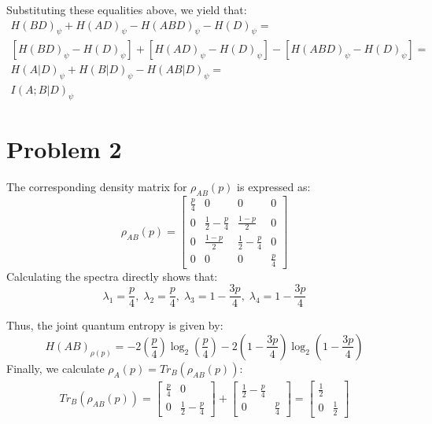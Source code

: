 \documentclass[12pt]{article}%
\begin{document}
\begin{enumerate}
Substituting these equalities above, we yield that:
\begin{gather*}
  H(BD)_{\psi} + H(AD)_{\psi} - H(ABD)_{\psi} - H(D)_{\psi} = \\
  [H(BD)_{\psi} - H(D)_{\psi}] + [H(AD)_{\psi} - H(D)_{\psi}] - [H(ABD)_{\psi} - H(D)_{\psi}] = \\
  H(A \vert D)_{\psi} + H(B \vert D)_{\psi} - H(AB \vert D)_{\psi} = \\
  \boxed{I(A;B\vert D)_{\psi}}
\end{gather*}

\section*{Problem 2}
The corresponding density matrix for $\rho_{AB}(p)$ is expressed as:
$$
\rho_{AB}(p) = \left[\begin{matrix}
  \frac{p}{4} & 0 & 0 & 0 \\
  0 & \frac{1}{2} - \frac{p}{4} & \frac{1-p}{2}  & 0 \\
  0 & \frac{1-p}{2} & \frac{1}{2} - \frac{p}{4} & 0\\
  0 & 0 & 0 & \frac{p}{4}
\end{matrix} \right]$$
Calculating the spectra directly shows that:
$$\lambda_1 = \frac{p}{4}, \; \lambda_2 = \frac{p}{4}, \; \lambda_3 = 1 - \frac{3p}{4}, \; \lambda_4 = 1 - \frac{3p}{4} $$
 \end{enumerate}
 Thus, the joint quantum entropy is given by:
 $$ H(AB)_{\rho(p)} =  - 2(\frac{p}{4})\log_2{(\frac{p}{4})} - 2 (1 - \frac{3p}{4})\log_2{(1- \frac{3p}{4})}$$
 Finally, we calculate $\rho_A(p) = Tr_B(\rho_{AB}(p))$:
 \begin{gather*}
   Tr_B(\rho_{AB}(p)) =
     \left[
        \begin{matrix}
          \frac{p}{4} & 0 \\
          0 & \frac{1}{2} - \frac{p}{4}
        \end{matrix}
     \right] +
     \left[
        \begin{matrix}
          \frac{1}{2} - \frac{p}{4} &  \\
          0 & \frac{p}{4}
        \end{matrix}
     \right] =
     \left[
        \begin{matrix}
          \frac{1}{2} &  \\
          0 & \frac{1}{2}
        \end{matrix}
     \right]
 \end{gather*}
\end{document}
